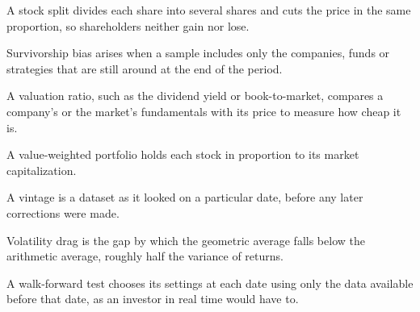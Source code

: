 \begin{keyterms}
\begin{description}[leftmargin=0pt, itemsep=2pt, parsep=0pt, font=\normalfont\bfseries\color{FEMaroon}]
  \item[Stock split.] A stock split divides each share into several shares and cuts the price in the same proportion, so shareholders neither gain nor lose.
  \item[Survivorship bias.] Survivorship bias arises when a sample includes only the companies, funds or strategies that are still around at the end of the period.
  \item[Valuation ratio.] A valuation ratio, such as the dividend yield or book-to-market, compares a company's or the market's fundamentals with its price to measure how cheap it is.
  \item[Value-weighted.] A value-weighted portfolio holds each stock in proportion to its market capitalization.
  \item[Vintage.] A vintage is a dataset as it looked on a particular date, before any later corrections were made.
  \item[Volatility drag.] Volatility drag is the gap by which the geometric average falls below the arithmetic average, roughly half the variance of returns.
  \item[Walk-forward test.] A walk-forward test chooses its settings at each date using only the data available before that date, as an investor in real time would have to.
\end{description}
\end{keyterms}
